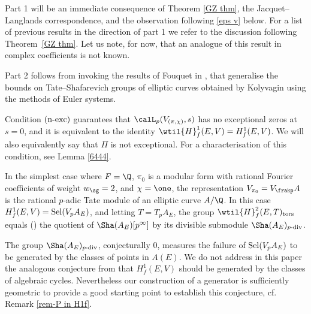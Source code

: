  Part 1    will be an immediate consequence of Theorem \ref{GZ thm},  the Jacquet--Langlands correspondence, and the observation following \eqref{eps v} below.
For a list of previous results in the direction of part 1 we refer to the discussion following Theorem~\ref{GZ thm}. Let us  note, for now, that an analogue of this result in complex coefficients is not known.

Part 2 follows from invoking the results of Fouquet in \cite{fouquet}, that generalise the bounds on Tate--Shafarevich groups of elliptic curves obtained by Kolyvagin using the methods of Euler systems.


\begin{rema}
\notready Condition $(\textup{n-exc})$ guarantees that $\calL_{p}(V_{(\pi, \chi)}, s)$ has no exceptional zeros at $s=0$, and it is equivalent to the identity $\wtil{H}^{1}_{f}(E, V)= {H}^{1}_{f}(E, V)$.  We will also  equivalently say that $\Pi$ is not exceptional.  For a characterisation of this condition, see Lemma \ref{6444}.
\end{rema} \begin{rema}
 In the simplest case  where $F=\Q$, $\pi_{0}$ is a modular form with rational Fourier coefficients of weight $w_{\sg}=2$, and   $\chi=\one$,
 the representation $V_{\pi_{0}}=V_{\frakp}A$ is  the rational $p$-adic  Tate module of an elliptic curve $A/\Q$. In this case ${H}^{1}_{f}(E, V)={\rm Sel}(V_{p}A_{E})$,
and letting $T=T_{p}A_{E}$, the group  $\wtil{H}^{2}_{f}(E, T)_{\rm tors}$ equals (\cite[(1.36)]{bu-fl}) the quotient of $\Sha(A_{E})[p^{\infty}]$ by its divisible submodule $\Sha(A_{E})_{p\textup{-div}}$.

The group $\Sha(A_{E})_{p\textup{-div}}$, conjecturally $0$,  measures the failure of ${\rm Sel}(V_{p}A_{E})$ to be generated by the classes of points in $A(E)$. We do not address in this paper the analogous conjecture from \cite{bk} that ${H}^{1}_{f}(E, V)$ should be generated by the classes of algebraic cycles.
Nevertheless our construction of a generator is sufficiently geometric to provide a good  starting point to establish this conjecture, cf. Remark \ref{rem-P in H1f}.
\end{rema}

